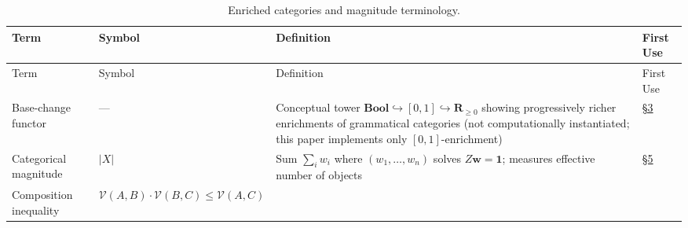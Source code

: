 \documentclass[
]{article}
\begin{document}
\begin{longtable}[]{@{}
  >{\raggedright\arraybackslash}p{}
  >{\centering\arraybackslash}p{}
  >{\raggedright\arraybackslash}p{}
  >{\centering\arraybackslash}p{}@{}}
\caption{Enriched categories and magnitude
terminology.}\label{tbl:not-enriched}\tabularnewline
\toprule\noalign{}
\begin{minipage}[b]{\linewidth}\raggedright
Term
\end{minipage} & \begin{minipage}[b]{\linewidth}\centering
Symbol
\end{minipage} & \begin{minipage}[b]{\linewidth}\raggedright
Definition
\end{minipage} & \begin{minipage}[b]{\linewidth}\centering
First Use
\end{minipage} \\
\midrule\noalign{}
\endfirsthead
\toprule\noalign{}
\begin{minipage}[b]{\linewidth}\raggedright
Term
\end{minipage} & \begin{minipage}[b]{\linewidth}\centering
Symbol
\end{minipage} & \begin{minipage}[b]{\linewidth}\raggedright
Definition
\end{minipage} & \begin{minipage}[b]{\linewidth}\centering
First Use
\end{minipage} \\
\midrule\noalign{}
\endhead
\bottomrule\noalign{}
\endlastfoot
Base-change functor & --- & Conceptual tower
\(\mathbf{Bool} \hookrightarrow [0,1] \hookrightarrow \mathbf{R}_{\geq 0}\)
showing progressively richer enrichments of grammatical categories (not
computationally instantiated; this paper implements only
\([0,1]\)-enrichment) &
\href{03_categorial_grammar.md\#sec:categorial-grammar}{§3} \\
Categorical magnitude & \(\lvert X \rvert\) & Sum \(\sum_i w_i\) where
\((w_1, \ldots, w_n)\) solves \(Z \mathbf{w} = \mathbf{1}\); measures
effective number of objects &
\href{05_enriched_categories.md\#sec:enriched-categories}{§5} \\
Composition inequality &
\(\mathcal{V}(A,B) \cdot \mathcal{V}(B,C) \leq \mathcal{V}(A,C)\) &

\end{longtable}
\end{document}
